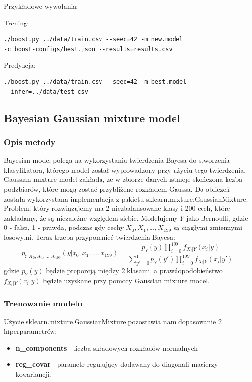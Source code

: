 \documentclass[12pt]{article}
\begin{document}
\noindent Przykładowe wywołania:

\noindent Trening:
\begin{lstlisting}
./boost.py ../data/train.csv --seed=42 -m new.model 
-c boost-configs/best.json --results=results.csv
\end{lstlisting}

\noindent Predykcja:
\begin{lstlisting}
./boost.py ../data/train.csv --seed=42 -m best.model
--infer=../data/test.csv
\end{lstlisting}


\subsection{Bayesian Gaussian mixture model}
\subsubsection{Opis metody}

Bayesian model polega na wykorzystaniu twierdzenia Bayesa do stworzenia klasyfikatora, którego model został wyprowadzony przy użyciu tego twierdzenia. Gaussian mixture model zakłada, że w zbiorze danych istnieje skończona liczba podzbiorów, które mogą zostać przybliżone rozkładem Gaussa. Do obliczeń została wykorzystana implementacja z pakietu sklearn.mixture.GaussianMixture. \\
Problem, który rozwiązujemy ma 2 niezbalansowane klasy i 200 cech, które zakładamy, że są niezależne względem siebie. Modelujemy $Y$ jako Bernoulli, gdzie 0 - fałsz, 1 - prawda, podczas gdy cechy $X_{0}, X_{1}, ... , X_{199}$ są ciągłymi zmiennymi losowymi. Teraz trzeba przypomnieć twierdzenia Bayesa:
\begin{equation}
    p_{Y|X_0,X_1,\ldots,X_{199}}(y|x_0,x_1,\ldots,x_{199})=\frac{p_Y(y)\prod_{i=0}^{199}f_{X_i|Y}(x_i|y)}{\sum_{y'=0}^1p_Y(y')\prod_{i=0}^{199}f_{X_i|Y}(x_i|y')}
\end{equation}
gdzie $p_Y(y)$ będzie proporcją między 2 klasami, a prawdopodobieństwo $f_{X_i|Y}(x_i|y)$ będzie uzyskane przy pomocy Gaussian mixture model.

\subsubsection{Trenowanie modelu}
Użycie sklearn.mixture.GaussianMixture pozostawia nam dopasowanie 2 hiperparametrów:
\begin{itemize}
    \item \textbf{n\_components} - liczba składowych rozkładów normalnych
    \item \textbf{reg\_covar} - parametr regulujący dodawany do diagonali macierzy kowariancji.
\end{itemize}
\end{document}
